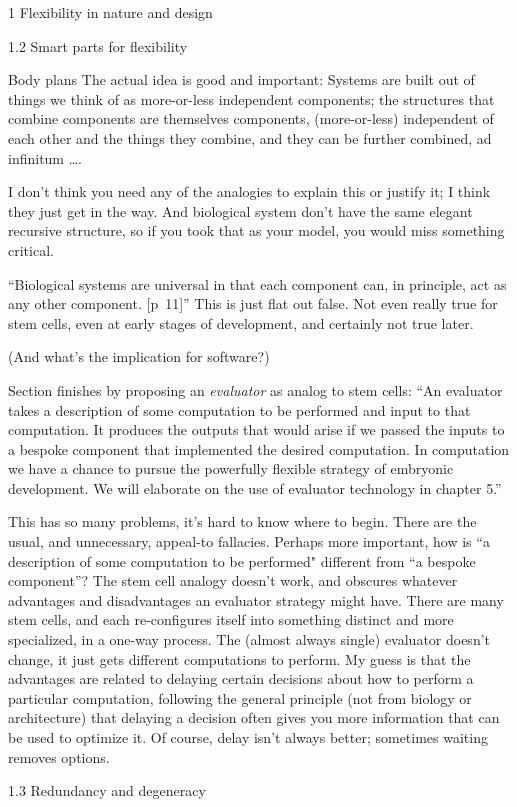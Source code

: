 \documentclass[11pt]{PalisadesLakesBook}
\begin{document}
\begin{plSection}{}
\begin{plSection}{1 Flexibility in nature and design}
\begin{plSection}{1.2 Smart parts for flexibility}
\begin{plSection}{Body plans}
The actual idea is good and important:
Systems are built out of things we think of as more-or-less
independent components;
the structures that combine components 
are themselves components,
(more-or-less) independent of each other 
and the things they combine,
and they can be further combined, ad infinitum {\ldots}.

I don't think you need any of the analogies to explain this
or justify it; I think they just get in the way.
And biological system don't have the same elegant recursive
structure, so if you took that as your model, 
you would miss something critical.

``Biological systems are universal in that each component can,
in principle, act as any other component. [p~11]''
This is just flat out false. 
Not even really true for stem cells, 
even at early stages of development,
and certainly not true later.

(And what's the implication for software?)

Section finishes by proposing an \emph{evaluator} as 
analog to stem cells:
``An evaluator takes a description of some computation
to be performed and input to that computation.
It produces the outputs that would arise if we passed the inputs
to a bespoke component that implemented the desired computation.
In computation we have a chance to pursue the powerfully
flexible strategy of embryonic development.
We will elaborate on the use of evaluator technology in chapter 5.''

This has so many problems, it's hard to know where to begin.
There are the usual, and unnecessary, appeal-to fallacies.
Perhaps more important, how is 
``a description of some computation to be performed"
different from 
``a bespoke component''? 
The stem cell analogy doesn't work, and obscures whatever
advantages and disadvantages an evaluator strategy might have.
There are many stem cells,
and each re-configures itself
into something distinct and more specialized, 
in a one-way process.
The (almost always single) evaluator doesn't change, 
it just gets different computations to perform.
My guess is that the advantages are related to delaying
certain decisions about how to perform a particular computation,
following the general principle (not from biology or architecture)
that delaying a decision often gives you 
more information that can be used to optimize it.
Of course, delay isn't always better; 
sometimes waiting removes options.

\end{plSection}%
\end{plSection}%
\begin{plSection}{1.3 Redundancy and degeneracy}


\end{plSection}
\end{plSection}
\end{plSection}
\end{document}
